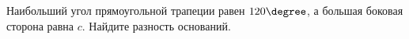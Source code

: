 \begin{ex}
	\begin{condition}
		Наибольший угол прямоугольной трапеции равен \( 120\degree \), а большая боковая сторона равна \( c \). Найдите разность оснований.
	\end{condition}
\end{ex}